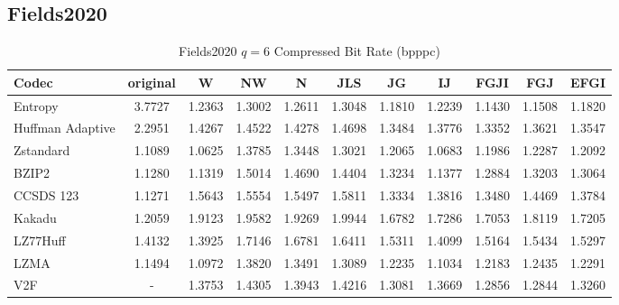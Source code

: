 \documentclass{article}
\begin{document}
\subsection{Fields2020}
\begin{table}[h!]
\centering
\caption{Fields2020 $q=6$ Compressed Bit Rate (bpppc)}
\begin{tabular}{|l|cccccccccc|}
\hline
Codec &  original &      W &     NW &      N &    JLS &     JG &     IJ &   FGJI &    FGJ &   EFGI \\
\hline
Entropy & 3.7727 & 1.2363 & 1.3002 & 1.2611 & 1.3048 & 1.1810 & 1.2239 & 1.1430 & 1.1508 & 1.1820 \\
\hline
Huffman Adaptive &    2.2951 & 1.4267 & 1.4522 & 1.4278 & 1.4698 & 1.3484 & 1.3776 & 1.3352 & 1.3621 & 1.3547 \\
Zstandard        &    1.1089 & 1.0625 & 1.3785 & 1.3448 & 1.3021 & 1.2065 & 1.0683 & 1.1986 & 1.2287 & 1.2092 \\
BZIP2            &    1.1280 & 1.1319 & 1.5014 & 1.4690 & 1.4404 & 1.3234 & 1.1377 & 1.2884 & 1.3203 & 1.3064 \\
CCSDS 123        &    1.1271 & 1.5643 & 1.5554 & 1.5497 & 1.5811 & 1.3334 & 1.3816 & 1.3480 & 1.4469 & 1.3784 \\
Kakadu           &    1.2059 & 1.9123 & 1.9582 & 1.9269 & 1.9944 & 1.6782 & 1.7286 & 1.7053 & 1.8119 & 1.7205 \\
LZ77Huff         &    1.4132 & 1.3925 & 1.7146 & 1.6781 & 1.6411 & 1.5311 & 1.4099 & 1.5164 & 1.5434 & 1.5297 \\
LZMA             &    1.1494 & 1.0972 & 1.3820 & 1.3491 & 1.3089 & 1.2235 & 1.1034 & 1.2183 & 1.2435 & 1.2291 \\
V2F              &   - & 1.3753 & 1.4305 & 1.3943 & 1.4216 & 1.3081 & 1.3669 & 1.2856 & 1.2844 & 1.3260 \\
\hline
\end{tabular}
\end{table}
\end{document}
